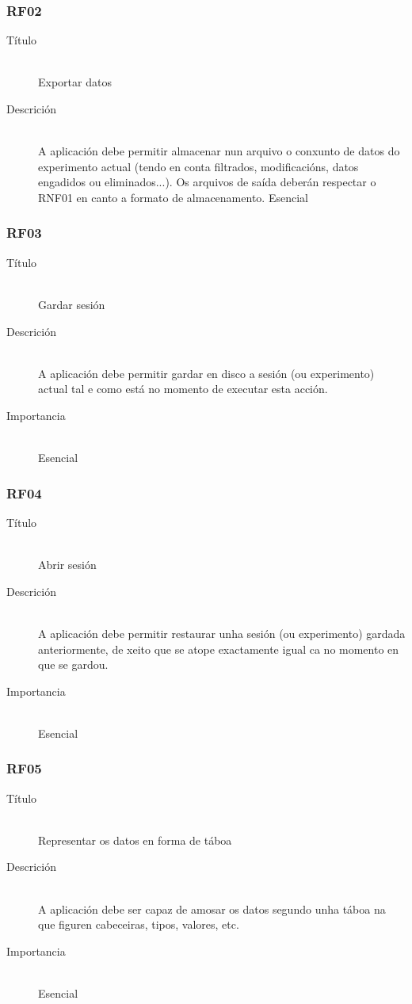 \subsubsection*{RF02}
\begin{description}
\item[Título] \hfill \\
Exportar datos
\item[Descrición] \hfill \\
A aplicación debe permitir almacenar nun arquivo o conxunto de datos do experimento actual (tendo en conta filtrados, modificacións, datos engadidos ou eliminados...). Os arquivos de saída deberán respectar o RNF01 en canto a formato de almacenamento.
Esencial
\end{description}

\subsubsection*{RF03}
\begin{description}
\item[Título] \hfill \\
Gardar sesión
\item[Descrición] \hfill \\
A aplicación debe permitir gardar en disco a sesión (ou experimento) actual tal e como está no momento de executar esta acción.
\item[Importancia] \hfill \\
Esencial
\end{description}

\subsubsection*{RF04}
\begin{description}
\item[Título] \hfill \\
Abrir sesión
\item[Descrición] \hfill \\
A aplicación debe permitir restaurar unha sesión (ou experimento) gardada anteriormente, de xeito que se atope exactamente igual ca no momento en que se gardou.
\item[Importancia] \hfill \\
Esencial
\end{description}

\subsubsection*{RF05}
\begin{description}
\item[Título] \hfill \\
Representar os datos en forma de táboa
\item[Descrición] \hfill \\
A aplicación debe ser capaz de amosar os datos segundo unha táboa na que figuren cabeceiras, tipos, valores, etc.
\item[Importancia] \hfill \\
Esencial
\end{description}

